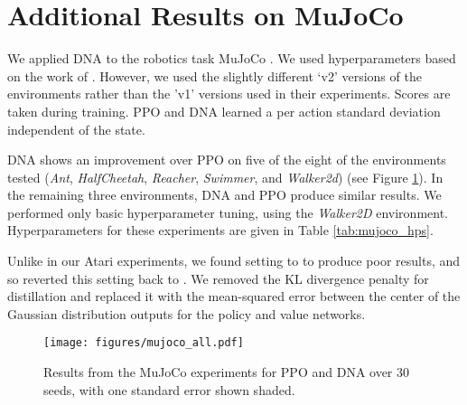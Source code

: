 \documentclass{article}
\begin{document}
\section{Additional Results on MuJoCo}
\label{app:mujoco}

We applied DNA to the robotics task MuJoCo \cite{todorov2012mujoco}. We used hyperparameters based on the work of \cite{schulman2017proximal}. However, we used the slightly different `v2' versions of the environments rather than the 'v1' versions used in their experiments. Scores are taken during training. PPO and DNA learned a per action standard deviation independent of the state. 

DNA shows an improvement over PPO on five of the eight of the environments tested (\textit{Ant}, \textit{HalfCheetah}, \textit{Reacher}, \textit{Swimmer}, and \textit{Walker2d}) (see Figure \ref{fig:mujoco}). In the remaining three environments, DNA and PPO produce similar results. We performed only basic hyperparameter tuning, using the \textit{Walker2D} environment. Hyperparameters for these experiments are given in Table \ref{tab:mujoco_hps}. 

Unlike in our Atari experiments, we found setting  to  to produce poor results, and so reverted this setting back to . We removed the KL divergence penalty for distillation and replaced it with the mean-squared error between the center of the Gaussian distribution outputs for the policy and value networks.

\begin{figure}
    \centering
    \texttt{[image: figures/mujoco\_all.pdf]}
    \caption{Results from the MuJoCo experiments for PPO and DNA over 30 seeds, with one standard error shown shaded.}
    \label{fig:mujoco}
\end{figure}
\end{document}
